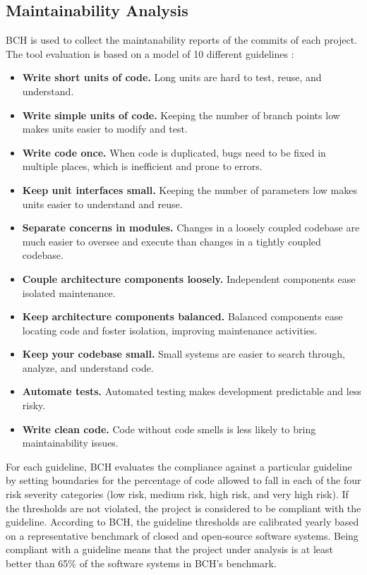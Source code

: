 \documentclass[10pt,conference]{IEEEtran}
\begin{document}
\subsection{Maintainability Analysis}

BCH is used to collect the maintanability reports of the commits of each project. The tool
evaluation is based on a model of 10 different guidelines \cite{Visser:2016:OREILLY}:

\begin{itemize}
	\item \textbf{Write short units of code.} Long units are hard to test, reuse, and understand.
	\item \textbf{Write simple units of code.} Keeping the number of branch points low makes units easier to modify and test.
	\item \textbf{Write code once.} When code is duplicated, bugs need to be fixed in multiple places, which is inefficient and
prone to errors.
	\item \textbf{Keep unit interfaces small.} Keeping the number of parameters low makes units easier to understand and reuse.
	\item \textbf{Separate concerns in modules.} Changes in a loosely
coupled codebase are much easier to oversee and execute
than changes in a tightly coupled codebase.
	\item \textbf{Couple architecture components loosely.} Independent
components ease isolated maintenance.
	\item \textbf{Keep architecture components balanced.} Balanced
components ease locating code and foster isolation,
improving maintenance activities.
	\item \textbf{Keep your codebase small.} Small systems are easier to
search through, analyze, and understand code.
	\item \textbf{Automate tests.} Automated testing makes development
predictable and less risky.
	\item \textbf{Write clean code.} Code without code smells is less likely to bring maintainability issues.
\end{itemize}

For each guideline, BCH evaluates the compliance against a particular guideline by setting boundaries for the percentage of code allowed to fall in each of the four risk severity categories (low risk, medium risk, high risk, and very high risk). If the thresholds are not violated, the project is considered to be compliant with the guideline. According to BCH, the guideline thresholds are calibrated yearly based on a representative benchmark of closed and open-source software systems. Being compliant with a guideline means that the project under analysis is at least better than 65\% of the software systems in BCH’s benchmark.
\end{document}
